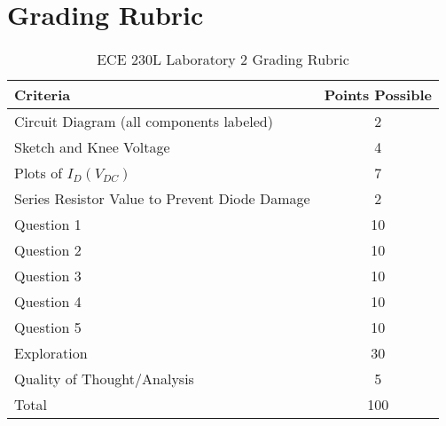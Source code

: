\documentclass[12pt]{../manual}
\begin{document}
\section*{Grading Rubric}
\vfill %
\begin{table}[ht!]
\caption{ECE 230L Laboratory 2 Grading Rubric}
\centering
\begin{tabular}{l|c} \hline
Criteria & Points Possible \\ \hline \hline
Circuit Diagram (all components labeled) 			& 2 \\ \hline
Sketch and Knee Voltage								& 4 \\ \hline
Plots of $I_D(V_{DC})$								& 7 \\ \hline
Series Resistor Value to Prevent Diode Damage		& 2 \\ \hline
Question 1											& 10 \\ \hline
Question 2											& 10 \\ \hline
Question 3											& 10 \\ \hline
Question 4											& 10 \\ \hline
Question 5											& 10 \\ \hline
Exploration											& 30 \\ \hline
Quality of Thought/Analysis							& 5 \\ \hline
Total												& 100 \\ \hline
\end{tabular}
\end{table}
\vfill %
\end{document}
